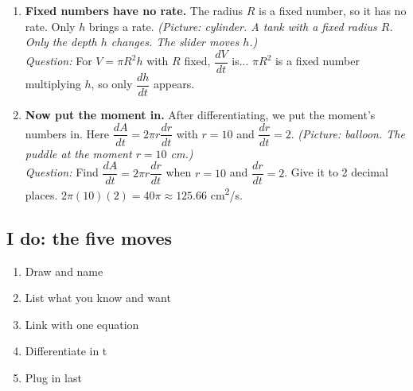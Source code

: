 \documentclass[11pt]{article}
\begin{document}
\begin{enumerate}
\item \textbf{Fixed numbers have no rate.} The radius $R$ is a fixed number, so it has no rate. Only $h$ brings a rate. \textit{(Picture: cylinder. A tank with a fixed radius $R$. Only the depth $h$ changes. The slider moves $h$.)}\\ \textit{Question:} For $V=\pi R^2h$ with $R$ fixed, $\dfrac{dV}{dt}$ is...  $\pi R^2$ is a fixed number multiplying $h$, so only $\dfrac{dh}{dt}$ appears.
\item \textbf{Now put the moment in.} After differentiating, we put the moment's numbers in. Here $\dfrac{dA}{dt}=2\pi r\dfrac{dr}{dt}$ with $r=10$ and $\dfrac{dr}{dt}=2$. \textit{(Picture: balloon. The puddle at the moment $r=10$ cm.)}\\ \textit{Question:} Find $\dfrac{dA}{dt}=2\pi r\dfrac{dr}{dt}$ when $r=10$ and $\dfrac{dr}{dt}=2$. Give it to 2 decimal places.  $2\pi(10)(2)=40\pi\approx125.66$ cm\textsuperscript{2}/s.
\end{enumerate}
\subsection*{I do: the five moves}\begin{enumerate}\item Draw and name
\item List what you know and want
\item Link with one equation
\item Differentiate in t
\item Plug in last\end{enumerate}
\end{document}

